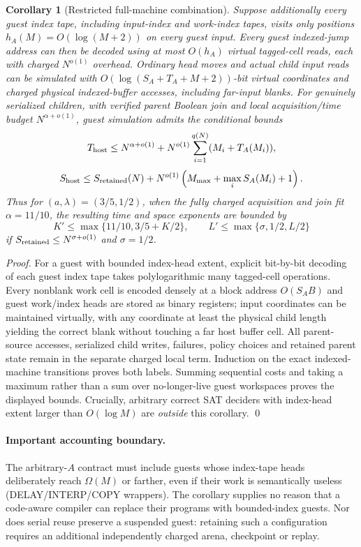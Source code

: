 \documentclass[11pt]{article}
\newtheorem{corollary}[theorem]{Corollary}
\begin{document}
\begin{corollary}[Restricted full-machine combination]
Suppose additionally \emph{every guest index tape}, including input-index and work-index tapes, visits only positions $h_A(M)=O(\log(M+2))$ on every guest input. Every guest indexed-jump address can then be decoded using at most $O(h_A)$ virtual tagged-cell reads, each with charged $N^{o(1)}$ overhead. Ordinary head moves and actual child input reads can be simulated with $O(\log(S_A+T_A+M+2))$-bit virtual coordinates and charged physical indexed-buffer accesses, including far-input blanks. For genuinely serialized children, with verified parent Boolean join and local acquisition/time budget $N^{\alpha+o(1)}$, guest simulation admits the \emph{conditional} bounds
\[
T_{\rm host}\le N^{\alpha+o(1)}+
 N^{o(1)}\sum_{i=1}^{q(N)}(M_i+T_A(M_i)),
\]
\[
S_{\rm host}\le S_{\rm retained}(N)+
 N^{o(1)}\left(M_{\max}+\max_i S_A(M_i)+1\right).
\]
Thus for $(a,\lambda)=(3/5,1/2)$, when the fully charged acquisition and join fit $\alpha=11/10$, the resulting time and space exponents are bounded by
\[
K'\le\max\{11/10,3/5+K/2\},\qquad
L'\le\max\{\sigma,1/2,L/2\}
\]
if $S_{\rm retained}\le N^{\sigma+o(1)}$ and $\sigma=1/2$.
\end{corollary}
\begin{proof}
For a guest with bounded index-head extent, explicit bit-by-bit decoding of each guest index tape takes polylogarithmic many tagged-cell operations. Every nonblank work cell is encoded densely at a block address $O(S_A B)$ and guest work/index heads are stored as binary registers; input coordinates can be maintained virtually, with any coordinate at least the physical child length yielding the correct blank without touching a far host buffer cell. All parent-source accesses, serialized child writes, failures, policy choices and retained parent state remain in the separate charged local term. Induction on the exact indexed-machine transitions proves both labels. Summing sequential costs and taking a maximum rather than a sum over no-longer-live guest workspaces proves the displayed bounds. Crucially, arbitrary correct SAT deciders with index-head extent larger than $O(\log M)$ are \emph{outside} this corollary. \qed
\end{proof}

\paragraph{Important accounting boundary.}
The arbitrary-$A$ contract must include guests whose index-tape heads deliberately reach $\Omega(M)$ or farther, even if their work is semantically useless (DELAY/INTERP/COPY wrappers). The corollary supplies no reason that a code-aware compiler can replace their programs with bounded-index guests. Nor does serial reuse preserve a suspended guest: retaining such a configuration requires an additional independently charged arena, checkpoint or replay.
\end{document}
